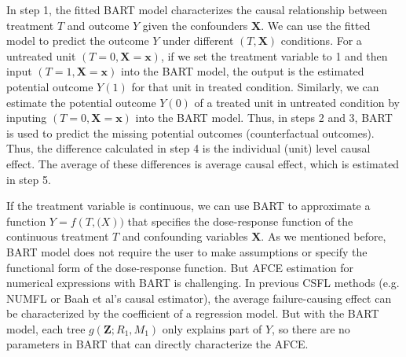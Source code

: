 In step 1, the fitted BART model characterizes the causal relationship between treatment $T$ and outcome $Y$ given the confounders $\pmb{X}$. We can use the fitted model to predict the outcome $Y$ under different $(T, \pmb{X})$ conditions. For a untreated unit $(T=0, \pmb{X}=\pmb{x})$,  if we set the treatment variable to 1 and then input $(T=1, \pmb{X}=\pmb{x})$ into the BART model, the output is the estimated potential outcome $Y(1)$ for that unit in treated condition. Similarly, we can estimate the potential outcome $Y(0)$ of a treated unit in untreated condition by inputing $(T=0, \pmb{X}=\pmb{x})$ into the BART model. Thus, in steps 2 and 3, BART is used to predict the missing potential outcomes (counterfactual outcomes). Thus, the difference calculated in step 4 is the individual (unit) level causal effect. The average of these differences is average causal effect, which is estimated in step 5.

If the treatment variable is continuous,  we can use BART to approximate a function $Y=f(T,\pmb(X))$ that specifies the dose-response function of the continuous treatment $T$ and confounding variables $\pmb{X}$.  As we mentioned before, BART model does not require the user to make assumptions or specify the functional form of the dose-response function.  But AFCE estimation for numerical expressions with BART is challenging. In previous CSFL methods (e.g. NUMFL or Baah et al’s causal estimator), the average failure-causing effect can be characterized by the coefficient of a regression model.  But with the BART model, each tree $g(\pmb{Z};{R_1},{M_1})$ only explains part of $Y$, so there are no parameters in BART that can directly characterize the AFCE. 

